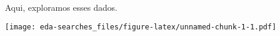 \documentclass[]{article}
\newenvironment{Shaded}{\begin{snugshade}}{\end{snugshade}}
\newcommand{\KeywordTok}[1]{\textcolor[rgb]{0.13,0.29,0.53}{\textbf{#1}}}
\newcommand{\DataTypeTok}[1]{\textcolor[rgb]{0.13,0.29,0.53}{#1}}
\newcommand{\DecValTok}[1]{\textcolor[rgb]{0.00,0.00,0.81}{#1}}
\newcommand{\StringTok}[1]{\textcolor[rgb]{0.31,0.60,0.02}{#1}}
\newcommand{\OperatorTok}[1]{\textcolor[rgb]{0.81,0.36,0.00}{\textbf{#1}}}
\newcommand{\NormalTok}[1]{#1}
\begin{document}
Aqui, exploramos esses dados.

\begin{Shaded}
\end{Shaded}

\texttt{[image: eda-searches\_files/figure-latex/unnamed-chunk-1-1.pdf]}
\end{document}
